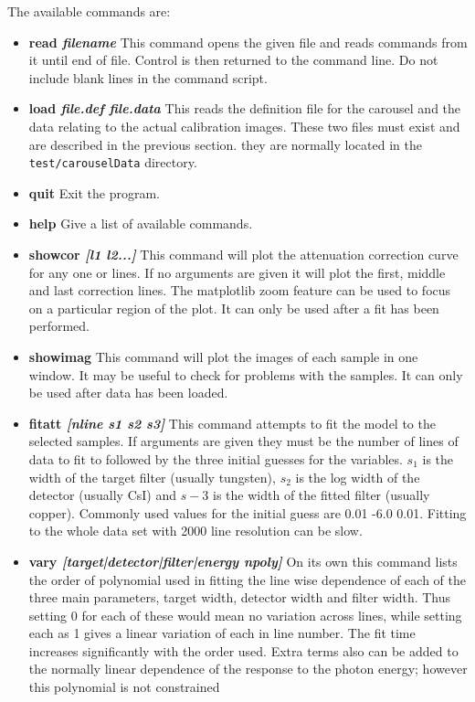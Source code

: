 \documentclass[a4paper]{article}
\begin{document}
The available commands are:
\begin{itemize}
\item{\bf read \it{filename}} This command opens the given file and reads commands from it until end of file.
Control is then returned to the command line. Do not include blank lines in the command script.
\item{\bf load \it{file.def} \it{file.data}} This reads the definition file for the carousel and the data
relating to the actual calibration images. These two files must exist and are described in the previous section.
they are normally located in the \texttt{test/carouselData} directory.
\item{\bf quit} Exit the program.
\item{\bf help} Give a list of available commands.
\item{\bf showcor \it{[l1 l2...]}} This command will plot the attenuation correction curve for any one or lines. If no arguments are given
it will plot the first, middle and last correction lines. The matplotlib zoom feature can be used to focus on a particular region of the
plot. It can only be used after a fit has been performed.
\item{\bf showimag} This command will plot the images of each sample in one window. It may be useful to check for problems with the samples.
It can only be used after data has been loaded.
\item{\bf fitatt \it{[nline s1 s2 s3]}} This command attempts to fit the model to the selected samples. If arguments are given they must be the
number of lines of data to fit to followed by the three initial guesses for the variables.
$s_1$ is the width of the target filter (usually tungsten), $s_2$ is the log width of the detector (usually CsI) and $s-3$ is the width of the
fitted filter (usually copper). Commonly used values for the initial guess are 0.01 -6.0 0.01.
Fitting to the whole data set with 2000 line resolution can be slow.
\item{\bf vary \it{[target|detector|filter|energy npoly]}} On its own this command lists the order of polynomial used in fitting the line wise
dependence of each of the three main parameters, target width, detector width and filter width.
Thus setting 0 for each of these would mean no variation across lines, while setting each as 1 gives a linear variation of each in line number.
The fit time increases significantly with the order used.
Extra terms also can be added to the normally linear dependence of the response to the photon energy; however this polynomial is not constrained

\end{itemize}
\end{document}
